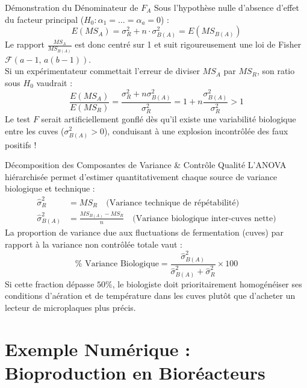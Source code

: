 \documentclass[11pt,a4paper]{article}
\begin{document}
\begin{conceptbox}{Démonstration du Dénominateur de $F_A$}
Sous l'hypothèse nulle d'absence d'effet du facteur principal ($H_0 : \alpha_1 = \dots = \alpha_a = 0$) :
\begin{equation*}
  E(MS_A) = \sigma_R^2 + n \cdot \sigma_{B(A)}^2 = E(MS_{B(A)})
\end{equation*}
Le rapport $\frac{MS_A}{MS_{B(A)}}$ est donc centré sur 1 et suit rigoureusement une loi de Fisher $\mathcal{F}(a-1, \, a(b-1))$.\\
Si un expérimentateur commettait l'erreur de diviser $MS_A$ par $MS_R$, son ratio sous $H_0$ vaudrait :
\begin{equation*}
  \frac{E(MS_A)}{E(MS_R)} = \frac{\sigma_R^2 + n \sigma_{B(A)}^2}{\sigma_R^2} = 1 + n \frac{\sigma_{B(A)}^2}{\sigma_R^2} > 1
\end{equation*}
Le test $F$ serait artificiellement gonflé dès qu'il existe une variabilité biologique entre les cuves ($\sigma_{B(A)}^2 > 0$), conduisant à une explosion incontrôlée des faux positifs !
\end{conceptbox}

\begin{biobox}{Décomposition des Composantes de Variance \& Contrôle Qualité}
L'ANOVA hiérarchisée permet d'estimer quantitativement chaque source de variance biologique et technique :
\begin{align*}
  \hat{\sigma}_R^2 &= MS_R \quad \text{(Variance technique de répétabilité)} \\[1mm]
  \hat{\sigma}_{B(A)}^2 &= \frac{MS_{B(A)} - MS_R}{n} \quad \text{(Variance biologique inter-cuves nette)}
\end{align*}
La proportion de variance due aux fluctuations de fermentation (cuves) par rapport à la variance non contrôlée totale vaut :
\begin{equation*}
  \% \text{ Variance Biologique} = \frac{\hat{\sigma}_{B(A)}^2}{\hat{\sigma}_{B(A)}^2 + \hat{\sigma}_R^2} \times 100
\end{equation*}
Si cette fraction dépasse $50\%$, le biologiste doit prioritairement homogénéiser ses conditions d'aération et de température dans les cuves plutôt que d'acheter un lecteur de microplaques plus précis.
\end{biobox}

\section{Exemple Numérique : Bioproduction en Bioréacteurs}
\end{document}
